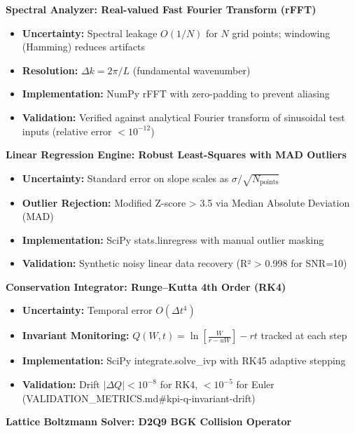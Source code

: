 \documentclass[
]{article}
\providecommand{\tightlist}{%
  \setlength{\itemsep}{0pt}\setlength{\parskip}{0pt}}
\begin{document}
\textbf{Spectral Analyzer: Real-valued Fast Fourier Transform (rFFT)}

\begin{itemize}
\tightlist
\item
  \textbf{Uncertainty:} Spectral leakage \(O(1/N)\) for \(N\) grid
  points; windowing (Hamming) reduces artifacts
\item
  \textbf{Resolution:} \(\Delta k = 2\pi/L\) (fundamental wavenumber)
\item
  \textbf{Implementation:} NumPy rFFT with zero-padding to prevent
  aliasing
\item
  \textbf{Validation:} Verified against analytical Fourier transform of
  sinusoidal test inputs (relative error \(< 10^{-12}\))
\end{itemize}

\textbf{Linear Regression Engine: Robust Least-Squares with MAD
Outliers}

\begin{itemize}
\tightlist
\item
  \textbf{Uncertainty:} Standard error on slope scales as
  \(\sigma/\sqrt{N_{\text{points}}}\)
\item
  \textbf{Outlier Rejection:} Modified Z-score \textgreater{} 3.5 via
  Median Absolute Deviation (MAD)
\item
  \textbf{Implementation:} SciPy stats.linregress with manual outlier
  masking
\item
  \textbf{Validation:} Synthetic noisy linear data recovery (R²
  \textgreater{} 0.998 for SNR=10)
\end{itemize}

\textbf{Conservation Integrator: Runge--Kutta 4th Order (RK4)}

\begin{itemize}
\tightlist
\item
  \textbf{Uncertainty:} Temporal error \(O(\Delta t^{4})\)
\item
  \textbf{Invariant Monitoring:}
  \(Q(W,t) = \ln\!\left[\tfrac{W}{r-uW}\right] - r t\) tracked at each
  step
\item
  \textbf{Implementation:} SciPy integrate.solve\_ivp with RK45 adaptive
  stepping
\item
  \textbf{Validation:} Drift \(|\Delta Q| < 10^{-8}\) for RK4,
  \(< 10^{-5}\) for Euler
  (VALIDATION\_METRICS.md\#kpi-q-invariant-drift)
\end{itemize}

\textbf{Lattice Boltzmann Solver: D2Q9 BGK Collision Operator}
\end{document}
